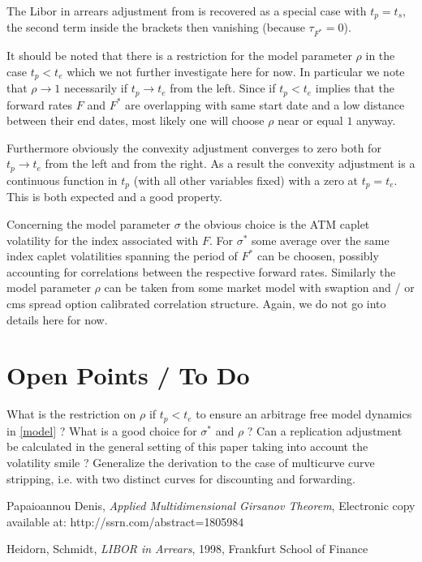 \documentclass{amsart}
\theoremstyle{plain}
\numberwithin{equation}{section}
\begin{document}
The Libor in arrears adjustment from \cite{Hfb} is recovered as a special case with $t_p=t_s$, the second term inside the brackets then vanishing (because $\tau_{F^*}=0$).

It should be noted that there is a restriction for the model parameter $\rho$ in the case $t_p < t_e$ which we not further investigate here for now. In particular we note that $\rho \rightarrow 1$ necessarily if $t_p \rightarrow t_e$ from the left. Since if $t_p < t_e$ implies that the forward rates $F$ and
$F^*$ are overlapping with same start date and a low distance between their end dates, most likely one will choose $\rho$ near or equal $1$ anyway.

Furthermore obviously the convexity adjustment converges to zero both for $t_p \rightarrow t_e$ from the left and from the right. As a result the convexity
adjustment is a continuous function in $t_p$ (with all other variables fixed) with a zero at $t_p = t_e$. This is both expected and a good property.

Concerning the model parameter $\sigma$ the obvious choice is the ATM caplet volatility for the index associated with $F$. For $\sigma^*$ some average
over the same index caplet volatilities spanning the period of $F^*$ can be choosen, possibly accounting for correlations between the respective forward rates. Similarly the model parameter $\rho$ can be taken from some market model with swaption and / or cms spread option calibrated correlation structure. Again, we do not go into details here for now.

\section{Open Points / To Do}

What is the restriction on $\rho$ if $t_p < t_e$  to ensure an arbitrage free model dynamics in \ref{model} ? What is a good choice for $\sigma^*$ and $\rho$  ? Can a replication adjustment be calculated in the general setting of this paper taking into account the volatility smile ? Generalize the derivation to the case of multicurve curve stripping, i.e. with two distinct curves for discounting and forwarding.




\begin{thebibliography}{2}

Papaioannou Denis, \textit{Applied Multidimensional Girsanov Theorem},
Electronic copy available at: http://ssrn.com/abstract=1805984

Heidorn, Schmidt, \textit{LIBOR in Arrears}, 1998, Frankfurt School of Finance

\end{thebibliography}
\end{document}
